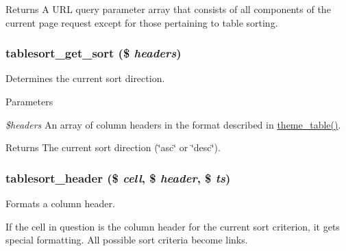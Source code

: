 \begin{DoxyReturn}{Returns}
A URL query parameter array that consists of all components of the current page request except for those pertaining to table sorting. 
\end{DoxyReturn}
\hypertarget{tablesort_8inc_ae0824a39d518b2e6dc8e603093be2146}{
\subsubsection[{tablesort\_\-get\_\-sort}]{\setlength{\rightskip}{0pt plus 5cm}tablesort\_\-get\_\-sort (\$ {\em headers})}}
\label{tablesort_8inc_ae0824a39d518b2e6dc8e603093be2146}
Determines the current sort direction.


\begin{DoxyParams}{Parameters}
\item[{\em \$headers}]An array of column headers in the format described in \hyperlink{group__themeable_ga9e35aa108c35f87b588197138a51823d}{theme\_\-table()}.\end{DoxyParams}
\begin{DoxyReturn}{Returns}
The current sort direction (\char`\"{}asc\char`\"{} or \char`\"{}desc\char`\"{}). 
\end{DoxyReturn}
\hypertarget{tablesort_8inc_a9c93c8e235c5013f0f494ba207ec1bdf}{
\subsubsection[{tablesort\_\-header}]{\setlength{\rightskip}{0pt plus 5cm}tablesort\_\-header (\$ {\em cell}, \/  \$ {\em header}, \/  \$ {\em ts})}}
\label{tablesort_8inc_a9c93c8e235c5013f0f494ba207ec1bdf}
Formats a column header.

If the cell in question is the column header for the current sort criterion, it gets special formatting. All possible sort criteria become links.


